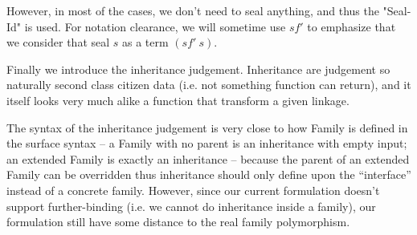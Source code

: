 However, in most of the cases, we don't need to seal anything, and thus the "Seal-Id" is used. For notation clearance, we will sometime use $sf'$ to emphasize that we consider that seal $s$ as a term $(sf' \ s)$. 





Finally we introduce the inheritance judgement. Inheritance are judgement so naturally second class citizen data (i.e. not something function can return), and it itself looks very much alike a function that transform a given linkage. 

The syntax of the inheritance judgement is very close to how Family is defined in the surface syntax -- a Family with no parent is an inheritance with empty input; an extended Family is exactly an inheritance -- because the parent of an extended Family can be overridden thus inheritance should only define upon the ``interface'' instead of a concrete family. However, since our current formulation doesn't support further-binding (i.e. we cannot do inheritance inside a family), our formulation still have some distance to the real family polymorphism.




